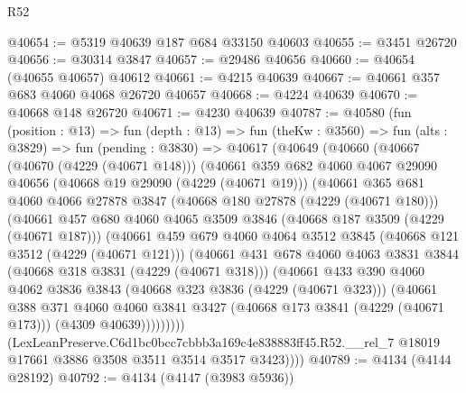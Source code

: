 \begin{lexlean}{R52}
\begin{coremodule}
@40654 := @5319 @40639 @187 @684 @33150 @40603
@40655 := @3451 @26720
@40656 := @30314 @3847
@40657 := @29486 @40656
@40660 := @40654 (@40655 @40657) @40612
@40661 := @4215 @40639
@40667 := @40661 @357 @683 @4060 @4068 @26720 @40657
@40668 := @4224 @40639
@40670 := @40668 @148 @26720
@40671 := @4230 @40639
@40787 := @40580
    (fun (position : @13) =>
    fun (depth : @13) =>
    fun (theKw : @3560) =>
    fun (alts : @3829) =>
    fun (pending : @3830) =>
    @40617
      (@40649
        (@40660
          (@40667
            (@40670 (@4229 (@40671 @148)))
            (@40661
              @359
              @682
              @4060
              @4067
              @29090
              @40656
              (@40668 @19 @29090 (@4229 (@40671 @19)))
              (@40661
                @365
                @681
                @4060
                @4066
                @27878
                @3847
                (@40668 @180 @27878 (@4229 (@40671 @180)))
                (@40661
                  @457
                  @680
                  @4060
                  @4065
                  @3509
                  @3846
                  (@40668 @187 @3509 (@4229 (@40671 @187)))
                  (@40661
                    @459
                    @679
                    @4060
                    @4064
                    @3512
                    @3845
                    (@40668 @121 @3512 (@4229 (@40671 @121)))
                    (@40661
                      @431
                      @678
                      @4060
                      @4063
                      @3831
                      @3844
                      (@40668 @318 @3831 (@4229 (@40671 @318)))
                      (@40661
                        @433
                        @390
                        @4060
                        @4062
                        @3836
                        @3843
                        (@40668 @323 @3836 (@4229 (@40671 @323)))
                        (@40661
                          @388
                          @371
                          @4060
                          @4060
                          @3841
                          @3427
                          (@40668 @173 @3841 (@4229 (@40671 @173)))
                          (@4309 @40639)))))))))
          (LexLeanPreserve.C6d1bc0bcc7cbbb3a169c4e838883ff45.R52.__rel_7
            @18019
            @17661
            @3886
            @3508
            @3511
            @3514
            @3517
            @3423))))
@40789 := @4134 (@4144 @28192)
@40792 := @4134 (@4147 (@3983 @5936))

\end{coremodule}
\end{lexlean}
